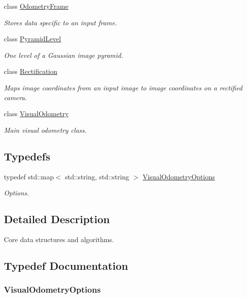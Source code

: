 \begin{DoxyCompactItemize}
class \hyperlink{classfovis_1_1OdometryFrame}{OdometryFrame}
\begin{DoxyCompactList}\small\item\em Stores data specific to an input frame. \end{DoxyCompactList}\item 
class \hyperlink{classfovis_1_1PyramidLevel}{PyramidLevel}
\begin{DoxyCompactList}\small\item\em One level of a Gaussian image pyramid. \end{DoxyCompactList}\item 
class \hyperlink{classfovis_1_1Rectification}{Rectification}
\begin{DoxyCompactList}\small\item\em Maps image coordinates from an input image to image coordinates on a rectified camera. \end{DoxyCompactList}\item 
class \hyperlink{classfovis_1_1VisualOdometry}{VisualOdometry}
\begin{DoxyCompactList}\small\item\em Main visual odometry class. \end{DoxyCompactList}\end{DoxyCompactItemize}
\subsection*{Typedefs}
\begin{DoxyCompactItemize}
\item 
typedef std::map$<$ std::string, std::string $>$ \hyperlink{group__FovisCore_ga113578b67d3e37bc78f1fffd8440e1ff}{VisualOdometryOptions}
\begin{DoxyCompactList}\small\item\em Options. \end{DoxyCompactList}\end{DoxyCompactItemize}


\subsection{Detailed Description}
Core data structures and algorithms. 

\subsection{Typedef Documentation}
\hypertarget{group__FovisCore_ga113578b67d3e37bc78f1fffd8440e1ff}{
\subsubsection[{VisualOdometryOptions}]{\setlength{\rightskip}{0pt plus 5cm}VisualOdometryOptions}}
\label{group__FovisCore_ga113578b67d3e37bc78f1fffd8440e1ff}


